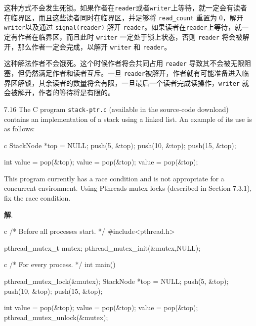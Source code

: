 \documentclass[12pt,a4paper]{article}
\newenvironment{problems}{\begin{list}{}{\renewcommand{\makelabel}[1]{\textbf{##1}\hfil}}}{\end{list}}
\providecommand{\sol}{\textbf{解}.~}
\begin{document}
\begin{problems}
    这种方式不会发生死锁。如果作者在\verb"reader"或者\verb"writer"上等待，就一定会有读者在临界区，而且这些读者同时在临界区，并足够将 \verb"read_count" 重置为 0，解开\verb"writer"以及通过 \verb"signal(reader)" 解开 \verb"reader"。如果读者在\verb"reader"上等待，就一定有作者在临界区，而且此时 \verb"writer" 一定处于锁上状态，否则 \verb"reader" 将会被解开，那么作者一定会完成，以解开 \verb"writer" 和 \verb"reader"。

    这种解法作者不会饿死。这个时候作者将会共同占用 \verb"reader" 导致其不会被无限阻塞，但仍然满足作者和读者互斥。一旦 \verb"reader"被解开，作者就有可能准备进入临界区解锁，其余读者的数量将会有限，一旦最后一个读者完成读操作，\verb"writer" 就会被解开，作者的等待将是有限的。
    \item[7.16] The C program \verb"stack-ptr.c" (available in the source-code download) contains an implementation of a stack using a linked list. An example of its use is as follows:
    \begin{code}{c}
        StackNode *top = NULL;
        push(5, &top);
        push(10, &top);
        push(15, &top);
        
        int value = pop(&top);
        value = pop(&top);
        value = pop(&top);
    \end{code} 
    This program currently has a race condition and is not appropriate for a concurrent environment. Using Pthreads mutex locks (described in Section 7.3.1), fix the race condition.

    \sol \begin{code}{c}
        /* Before all processes start. */
        #include<pthread.h>

        pthread_mutex_t mutex;
        pthread_mutex_init(&mutex,NULL);
    \end{code}
    \begin{code}{c}
        /* For every process. */
        int main(){
            pthread_mutex_lock(&mutex);
            StackNode *top = NULL;
            push(5, &top);
            push(10, &top);
            push(15, &top);
            
            int value = pop(&top);
            value = pop(&top);
            value = pop(&top);
            pthread_mutex_unlock(&mutex);
        }
    \end{code} 
\end{problems}
\end{document}
